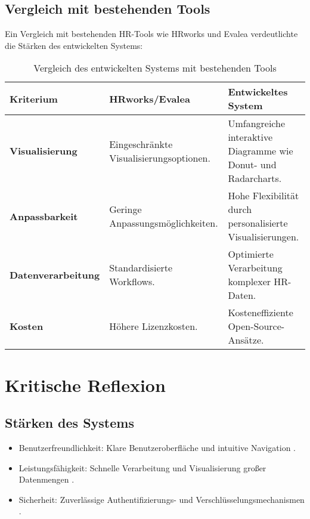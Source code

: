 \subsection{Vergleich mit bestehenden Tools}
Ein Vergleich mit bestehenden HR-Tools wie HRworks und Evalea verdeutlichte die St\"arken des entwickelten Systems:
\begin{table}[h!]
\centering
\caption{Vergleich des entwickelten Systems mit bestehenden Tools}
\label{tab:tool_comparison}
\begin{tabularx}{\textwidth}{|X|X|X|}
\hline
\textbf{Kriterium}              & \textbf{HRworks/Evalea}                                                                 & \textbf{Entwickeltes System}                                                          \\\hline
\textbf{Visualisierung}         & Eingeschr\"ankte Visualisierungsoptionen.                 & Umfangreiche interaktive Diagramme wie Donut- und Radarcharts.                      \\\hline
\textbf{Anpassbarkeit}          & Geringe Anpassungsm\"oglichkeiten.                       & Hohe Flexibilit\"at durch personalisierte Visualisierungen.                        \\\hline
\textbf{Datenverarbeitung}      & Standardisierte Workflows.                           & Optimierte Verarbeitung komplexer HR-Daten.                                         \\\hline
\textbf{Kosten}                 & H\"ohere Lizenzkosten.                                  & Kosteneffiziente Open-Source-Ans\"atze.                                             \\\hline
\end{tabularx}
\end{table}

\section{Kritische Reflexion}
\subsection{St\"arken des Systems}
\begin{itemize}
    \item Benutzerfreundlichkeit: Klare Benutzeroberfl\"ache und intuitive Navigation \cite{heer2012interactive}.
    \item Leistungsf\"ahigkeit: Schnelle Verarbeitung und Visualisierung gro\ss er Datenmengen \cite{chen2012interactive}.
    \item Sicherheit: Zuverl\"assige Authentifizierungs- und Verschl\"usselungsmechanismen \cite{boneder2023evaluation}.
\end{itemize}

